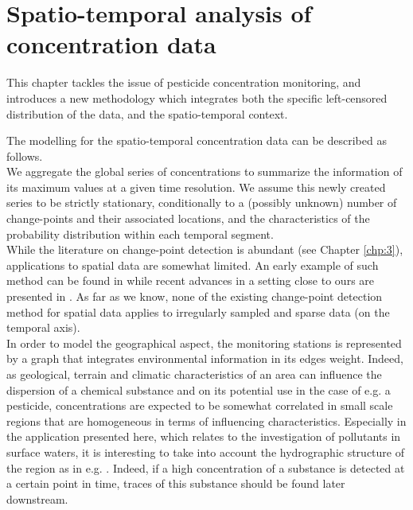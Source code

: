 \chapter{Spatio-temporal analysis of concentration data}\label{chp:5}

\minitoc

\clearpage

This chapter tackles the issue of pesticide concentration monitoring, and introduces a new methodology which integrates both the specific left-censored distribution of the data, and the spatio-temporal context. 

The modelling for the spatio-temporal concentration data can be described as follows. \\
We aggregate the global series of concentrations to summarize the information of its maximum values at a given time resolution. We assume this newly created series to be strictly stationary, conditionally to a (possibly unknown) number of change-points and their associated locations, and the characteristics of the probability distribution within each temporal segment. \\
While the literature on change-point detection is abundant (see Chapter \ref{chp:3}), applications to spatial data are somewhat limited. An early example of such method can be found in \cite{MAJUMDAR2005149} while recent advances in a setting close to ours are presented in \cite{doi:10.1080/07474946.2020.1826796}. As far as we know, none of the existing change-point detection method for spatial data applies to irregularly sampled and sparse data (on the temporal axis). \\
In order to model the geographical aspect, the monitoring stations is represented by a graph that integrates environmental information in its edges weight. Indeed, as geological, terrain and climatic characteristics of an area can influence the dispersion of a chemical substance and on its potential use in the case of e.g. a pesticide, concentrations are expected to be somewhat correlated in small scale regions that are homogeneous in terms of influencing characteristics. Especially in the application presented here, which relates to the investigation of pollutants in surface waters, it is interesting to take into account the hydrographic structure of the region as in e.g. \cite{doi:10.1080/07474946.2020.1826796}. Indeed, if a high concentration of a substance is detected at a certain point in time, traces of this substance should be found later downstream. 

